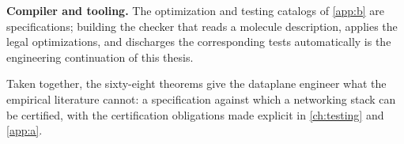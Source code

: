 \textbf{Compiler and tooling.} The optimization and testing catalogs of \autoref{app:b} are specifications; building the checker that reads a molecule description, applies the legal optimizations, and discharges the corresponding tests automatically is the engineering continuation of this thesis.

Taken together, the sixty-eight theorems give the dataplane engineer what the empirical literature cannot: a specification against which a networking stack can be certified, with the certification obligations made explicit in \autoref{ch:testing} and \autoref{app:a}.
